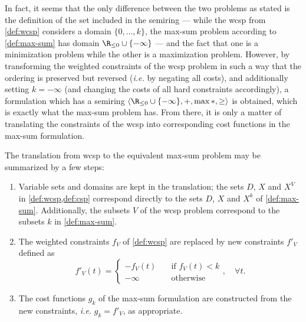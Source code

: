 In fact, it seems that the only difference between the two problems as stated is the definition of the set included in the semiring --- while the \gls{wcsp} from \cref{def:wcsp} considers a domain \(\{0,\dotsc,k\}\), the max-sum problem according to \cref{def:max-sum} has domain \(\Rminus \cup \{-\infty\}\) --- and the fact that one is a minimization problem while the other is a maximization problem.
However, by transforming the weighted constraints of the \gls{wcsp} problem in such a way that the ordering is preserved but reversed (\emph{i.e.} by negating all costs), and additionally setting \(k=-\infty\) (and changing the costs of all hard constraints accordingly), a formulation which has a semiring \(\langle\Rminus \cup \{-\infty\},+,\max*,\geq\rangle\) is obtained, which is exactly what the max-sum problem has.
From there, it is only a matter of translating the constraints of the \gls{wcsp} into corresponding cost functions in the max-sum formulation.

The translation from \gls{wcsp} to the equivalent max-sum problem may be summarized by a few steps:
\begin{enumerate}
	\item Variable sets and domains are kept in the translation; the sets \(D\), \(X\) and \(X^V\) in \cref{def:wcsp,def:csp} correspond directly to the sets \(D\), \(X\) and \(X^k\) of \cref{def:max-sum}. Additionally, the subsets \(V\) of the \gls{wcsp} problem correspond to the subsets \(k\) in \cref{def:max-sum}.
	\item The weighted constraints \(f_V\) of \cref{def:wcsp} are replaced by new constraints \(f'_V\) defined as
	\begin{equation*}
		f'_V(t) = \begin{cases}
			-f_V(t) &\quad \text{if \(f_V(t) < k\)} \\
			-\infty &\quad \text{otherwise}
		\end{cases}, \quad \forall t.
	\end{equation*}
	\item The cost functions \(g_k\) of the max-sum formulation are constructed from the new constraints, \emph{i.e.} \(g_k = f'_V\), as appropriate.
\end{enumerate}

